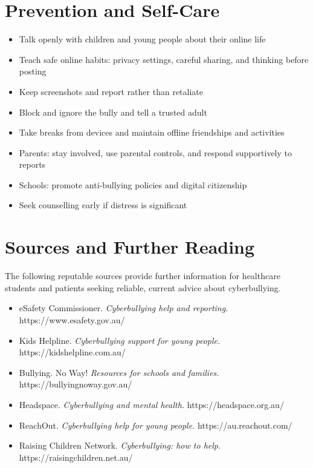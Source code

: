 \section*{Prevention and Self-Care}
\begin{itemize}
    \item Talk openly with children and young people about their online life
    \item Teach safe online habits: privacy settings, careful sharing, and thinking before posting
    \item Keep screenshots and report rather than retaliate
    \item Block and ignore the bully and tell a trusted adult
    \item Take breaks from devices and maintain offline friendships and activities
    \item Parents: stay involved, use parental controls, and respond supportively to reports
    \item Schools: promote anti-bullying policies and digital citizenship
    \item Seek counselling early if distress is significant
\end{itemize}

\section*{Sources and Further Reading}
The following reputable sources provide further information for healthcare students and patients seeking reliable, current advice about cyberbullying.

\begin{itemize}
    \item eSafety Commissioner. \textit{Cyberbullying help and reporting.} https://www.esafety.gov.au/
    \item Kids Helpline. \textit{Cyberbullying support for young people.} https://kidshelpline.com.au/
    \item Bullying. No Way! \textit{Resources for schools and families.} https://bullyingnoway.gov.au/
    \item Headspace. \textit{Cyberbullying and mental health.} https://headspace.org.au/
    \item ReachOut. \textit{Cyberbullying help for young people.} https://au.reachout.com/
    \item Raising Children Network. \textit{Cyberbullying: how to help.} https://raisingchildren.net.au/
\end{itemize}
